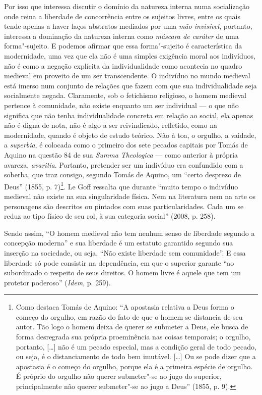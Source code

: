 Por isso que interessa discutir o domínio da natureza interna
numa socialização onde reina a liberdade de concorrência entre os
sujeitos livres, entre os quais tende apenas a haver laços abstratos
mediados por uma \emph{mão invisível}, portanto, interessa a dominação
da natureza interna como \emph{máscara de caráter} de uma
forma"-sujeito. E podemos afirmar que essa forma"-sujeito é característica
da modernidade, uma vez que ela não é uma simples exigência moral aos
indivíduos, não é como a negação explícita da individualidade como
acontecia no quadro medieval em proveito de um ser transcendente. O
indivíduo no mundo medieval está imerso num conjunto de relações que
fazem com que sua individualidade seja socialmente negada. Claramente,
sob o fetichismo religioso, o homem medieval pertence à comunidade, não
existe enquanto um ser individual --- o que não significa que não tenha
individualidade concreta em relação ao social, ela apenas não é digna de
nota, não é algo a ser reivindicado, refletido, como na modernidade,
quando é objeto de estudo teórico. Não à toa, o orgulho, a vaidade, a
\emph{superbia}, é colocada como o primeiro dos sete pecados capitais
por Tomás de Aquino na questão 84 de sua \emph{Summa Theologica} --- como anterior à própria avareza, \emph{avaritia}. Portanto,
pretender ser um indivíduo era confundido com a soberba, que traz
consigo, segundo Tomás de Aquino, um ``certo desprezo de Deus'' (1855,
p. 7)\footnote{Como destaca Tomás de Aquino: ``A apostasia relativa a
  Deus forma o começo do orgulho, em razão do fato de que o homem se
  distancia de seu autor. Tão logo o homem deixa de querer se submeter a
  Deus, ele busca de forma desregrada sua própria proeminência nas
  coisas temporais; o orgulho, portanto, [\ldots{}] não é um pecado
  especial, mas a condição geral de todo pecado, ou seja, é o
  distanciamento de todo bem imutável. [\ldots{}] Ou se pode dizer
  que a apostasia é o começo do orgulho, porque ela é a primeira espécie
  de orgulho. É próprio do orgulho não querer submeter"-se ao jugo do
  superior, principalmente não querer submeter"-se ao jugo a Deus'' (1855,
  p. 9).}. Le Goff ressalta que durante ``muito tempo o indivíduo
medieval não existe na sua singularidade física. Nem na literatura nem
na arte os personagens são descritos ou pintados com suas
particularidades. Cada um se reduz ao tipo físico de seu rol, à sua
categoria social'' (2008, p. 258).

Sendo assim, ``O homem medieval não tem nenhum senso de liberdade
segundo a concepção moderna'' e sua liberdade é um estatuto garantido
segundo sua inserção na sociedade, ou seja, ``Não existe liberdade sem
comunidade''. E essa liberdade só pode consistir na dependência, em que
o superior garante ``ao subordinado o respeito de seus direitos. O homem
livre é aquele que tem um protetor poderoso'' (\emph{Idem}, p. 259).

